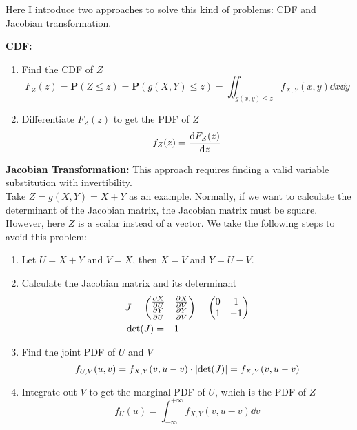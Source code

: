 Here I introduce two approaches to solve this kind of problems: CDF and Jacobian transformation.
\begin{solution}
    \textbf{CDF:}
    \begin{enumerate}
        \item Find the CDF of $Z$
            \begin{equation}
                F_{Z}(z) = \mathbf{P}(Z \leq z) = \mathbf{P}(g(X, Y) \leq z) = \iint_{g(x, y) \leq z} f_{X, Y}(x, y) \dd{x} \dd{y}
            \end{equation}
        \item Differentiate $F_{Z}(z)$ to get the PDF of $Z$
            \begin{equation}
                f_{Z}(z) = \dv{F_{Z}(z)}{z}
            \end{equation}
    \end{enumerate}
\end{solution}
\begin{solution}
    \textbf{Jacobian Transformation:} This approach requires finding a valid variable substitution with invertibility. \\ 
    Take $Z = g(X, Y) = X + Y$ as an example. Normally, if we want to calculate the determinant of the Jacobian matrix, the Jacobian matrix must be square. However, here $Z$ is a scalar instead of a vector. We take the following steps to avoid this problem:
    \begin{enumerate}
        \item Let $U = X + Y$ and $V = X$, then $X = V$ and $Y = U - V$.
        \item Calculate the Jacobian matrix and its determinant
            \begin{align}
                &J = \mqty(\pdv{X}{U} & \pdv{X}{V} \\ \pdv{Y}{U} & \pdv{Y}{V}) = \mqty(0 & 1 \\ 1 & -1) \\ 
                &\det(J) = -1 
            \end{align}
        \item Find the joint PDF of $U$ and $V$
            \begin{equation}
                f_{U, V}(u, v) = f_{X, Y}(v, u - v) \cdot \abs{\det(J)} = f_{X, Y}(v, u - v)
            \end{equation}
        \item Integrate out $V$ to get the marginal PDF of $U$, which is the PDF of $Z$
            \begin{equation}
                f_{U}(u) = \int_{-\infty}^{+\infty} f_{X, Y}(v, u - v) \dd{v}
            \end{equation}
    \end{enumerate}
\end{solution}
